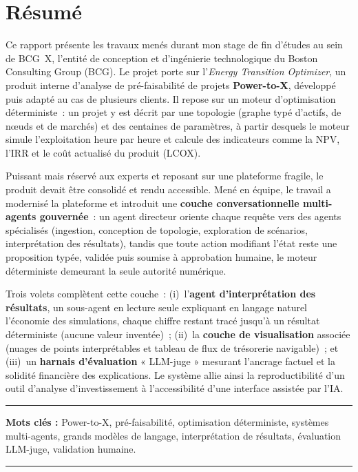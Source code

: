 \chapter*{Résumé}

Ce rapport présente les travaux menés durant mon stage de fin d'études au sein
de BCG~X, l'entité de conception et d'ingénierie technologique du Boston
Consulting Group (BCG). Le projet porte sur l'\textit{Energy Transition
Optimizer}, un produit interne d'analyse de pré-faisabilité de projets
\textbf{Power-to-X}, développé puis adapté au cas de
plusieurs clients. Il repose sur un moteur d'optimisation déterministe~: un
projet y est décrit par une topologie (graphe typé d'actifs, de n\oe uds et de
marchés) et des centaines de paramètres, à partir desquels le moteur simule
l'exploitation heure par heure et calcule des indicateurs comme la NPV, l'IRR
et le coût actualisé du produit (LCOX).

Puissant mais réservé aux experts et reposant sur une plateforme fragile, le
produit devait être consolidé et rendu accessible. Mené en équipe, le travail a
modernisé la plateforme et introduit une \textbf{couche conversationnelle
multi-agents gouvernée}~: un agent directeur oriente chaque requête vers des
agents spécialisés (ingestion, conception de topologie, exploration de
scénarios, interprétation des résultats), tandis que toute action modifiant
l'état reste une proposition typée, validée puis soumise à approbation humaine,
le moteur déterministe demeurant la seule autorité numérique.

Trois volets complètent cette couche~:
(i)~l'\textbf{agent d'interprétation des résultats}, un sous-agent en lecture
seule expliquant en langage naturel l'économie des simulations, chaque chiffre
restant tracé jusqu'à un résultat déterministe (aucune valeur inventée)~;
(ii)~la \textbf{couche de visualisation} associée (nuages de points
interprétables et tableau de flux de trésorerie navigable)~; et (iii)~un
\textbf{harnais d'évaluation} « LLM-juge » mesurant l'ancrage factuel et la
solidité financière des explications. Le système allie ainsi la reproductibilité
d'un outil d'analyse d'investissement à l'accessibilité d'une interface assistée
par l'IA.

\noindent\rule[2pt]{\textwidth}{0.5pt}

{\textbf{Mots clés :}}
Power-to-X, pré-faisabilité, optimisation déterministe, systèmes multi-agents,
grands modèles de langage, interprétation de résultats, évaluation LLM-juge,
validation humaine.
\\
\noindent\rule[2pt]{\textwidth}{0.5pt}
